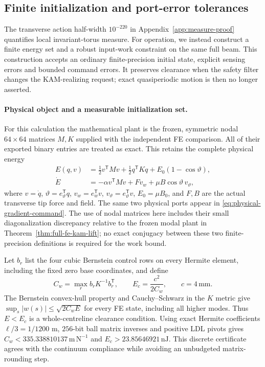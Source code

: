 \subsection{Finite initialization and port-error tolerances}
\label{sec:operational-tolerances}

The transverse action half-width $10^{-220}$ in
Appendix~\ref{app:measure-proof} quantifies local invariant-torus measure.
For operation, we instead construct a finite energy set and a robust
input-work constraint on the same full beam. This construction accepts
an ordinary finite-precision initial state, explicit sensing errors and
bounded command errors. It preserves clearance when the safety filter
changes the KAM-realizing request; exact quasiperiodic motion is then no
longer asserted.

\paragraph{Physical object and a measurable initialization set.}
For this calculation the mathematical plant is the frozen, symmetric
nodal $64\times64$ matrices $M,K$ supplied with the independent FE
comparison. All of their exported binary entries are treated as exact.
This retains the complete physical energy
\begin{equation}
 \begin{aligned}
 E(q,v)&=\tfrac12v^{\mathsf T}Mv+\tfrac12q^{\mathsf T}Kq
                 +E_0(1-\cos\vartheta),\\
 \dot E&=-\alpha v^{\mathsf T}Mv
          +Fv_w+\mu B\cos\vartheta\,v_\vartheta,
 \end{aligned}
 \label{eq:operational-physical-power}
\end{equation}
where $v=\dot q$, $\vartheta=e_\vartheta^{\mathsf T}q$,
$v_w=e_w^{\mathsf T}v$, $v_\vartheta=e_\vartheta^{\mathsf T}v$,
$E_0=\mu B_0$, and $F,B$ are the actual transverse tip force and field.
The same two physical ports appear in
\eqref{eq:physical-gradient-command}. The use of nodal matrices here
includes their small diagonalization discrepancy relative to the frozen
modal plant in Theorem~\ref{thm:full-fe-kam-lift}; no exact conjugacy between
these two finite-precision definitions is required for the work bound.

Let $b_r$ list the four cubic Bernstein control rows on every Hermite
element, including the fixed zero base coordinates, and define
\begin{equation}
 C_w=\max_r b_rK^{-1}b_r^{\mathsf T},\qquad
 E_c=\frac{c^2}{2C_w},\qquad c=4\,\mathrm{mm}.
 \label{eq:operational-fe-compliance}
\end{equation}
The Bernstein convex-hull property and Cauchy--Schwarz in the $K$ metric
give $\sup_s|w(s)|\leq\sqrt{2C_wE}$ for every FE state, including all
higher modes. Thus $E<E_c$ is a whole-centreline clearance condition.
Using exact Hermite coefficients $\ell/3=1/1200$ m, $256$-bit ball
matrix inverses and positive LDL pivots gives
$C_w<335.338810137\,\mathrm{m\,N^{-1}}$ and
$E_c>23.85646921\,\mathrm{nJ}$. This discrete certificate agrees with
the continuum compliance while avoiding an unbudgeted matrix-rounding step.

